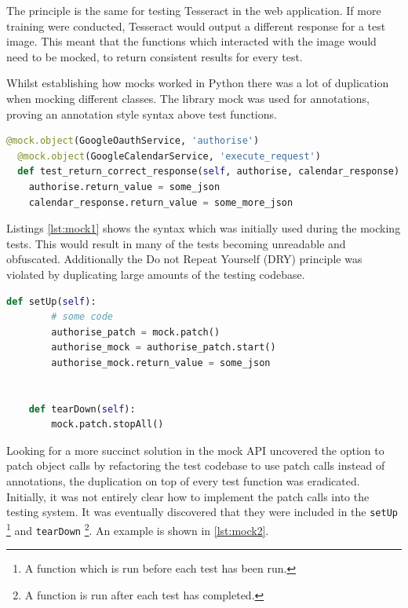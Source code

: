 The principle is the same for testing Tesseract in the web application. If more training were conducted, Tesseract would output a different response for a test image. This meant that the functions which interacted with the image would need to be mocked, to return consistent results for every test.

Whilst establishing how mocks worked in Python there was a lot of duplication when mocking different classes. The library mock \cite{citeulike:14020599} was used for annotations, proving an annotation style syntax above test functions.

\begin{lstlisting}[language=python, caption={An example of using mocks, following the annotation pattern}, label={lst:mock1}, breaklines, columns=fullflexible, keywordstyle=\color{blue}, basicstyle=\normalsize\ttfamily]
  @mock.object(GoogleOauthService, 'authorise')
  @mock.object(GoogleCalendarService, 'execute_request')
  def test_return_correct_response(self, authorise, calendar_response):
    authorise.return_value = some_json
    calendar_response.return_value = some_more_json
\end{lstlisting}

Listings \ref{lst:mock1} shows the syntax which was initially used during the mocking tests. This would result in many of the tests becoming unreadable and obfuscated. Additionally the Do not Repeat Yourself (DRY) principle was violated by duplicating large amounts of the testing codebase.

\begin{lstlisting}[language=python, label={lst:mock2}, breaklines, columns=fullflexible, keywordstyle=\color{blue}, caption={Mocks using the patch and start. It stops in the dear downs}, basicstyle=\normalsize\ttfamily]
    def setUp(self):
        # some code
        authorise_patch = mock.patch()
        authorise_mock = authorise_patch.start()
        authorise_mock.return_value = some_json


    def tearDown(self):
        mock.patch.stopAll()
\end{lstlisting}

Looking for a more succinct solution in the mock API uncovered the option to patch object calls by refactoring the test codebase to use patch calls instead of annotations, the duplication on top of every test function was eradicated. Initially, it was not entirely clear how to implement the patch calls into the testing system. It was eventually discovered that they were included in the \texttt{setUp} \footnote{A function which is run before each test has been run.} and \texttt{tearDown} \footnote{A function is run after each test has completed.}. An example is shown in \ref{lst:mock2}.

